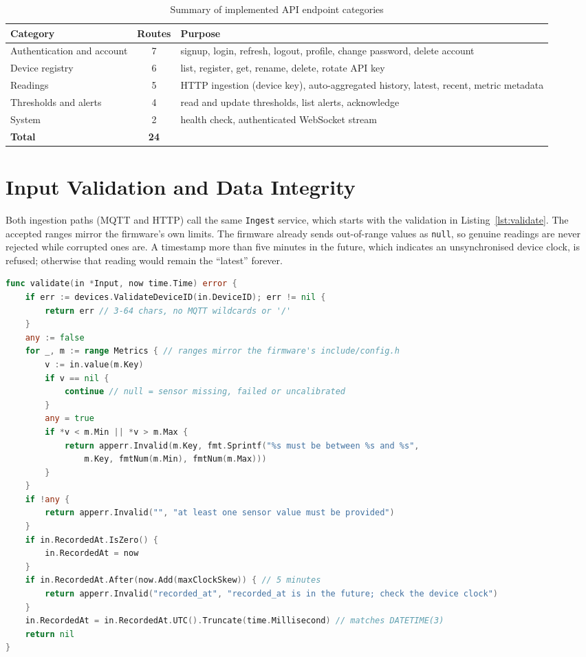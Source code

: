 \documentclass[11pt,a4paper,oneside]{report}
\newcommand{\code}[1]{\texttt{#1}}
\begin{document}
\begin{table}[htbp]
\centering
\caption{Summary of implemented API endpoint categories}
\label{tab:endpoints}
\small
\begin{tabularx}{\linewidth}{@{}l c X@{}}
\toprule
\textbf{Category} & \textbf{Routes} & \textbf{Purpose} \\
\midrule
Authentication and account & 7 & signup, login, refresh, logout, profile, change password, delete account \\
Device registry            & 6 & list, register, get, rename, delete, rotate API key \\
Readings                   & 5 & HTTP ingestion (device key), auto-aggregated history, latest, recent, metric metadata \\
Thresholds and alerts      & 4 & read and update thresholds, list alerts, acknowledge \\
System                     & 2 & health check, authenticated WebSocket stream \\
\midrule
\textbf{Total}             & \textbf{24} & \\
\bottomrule
\end{tabularx}
\end{table}

\section{Input Validation and Data Integrity}
Both ingestion paths (MQTT and HTTP) call the same \code{Ingest} service, which starts
with the validation in Listing~\ref{lst:validate}. The accepted ranges mirror the
firmware's own limits. The firmware already sends out-of-range values as \code{null},
so genuine readings are never rejected while corrupted ones are. A timestamp more than
five minutes in the future, which indicates an unsynchronised device clock, is
refused; otherwise that reading would remain the ``latest'' forever.

\begin{lstlisting}[language=Go, caption={Payload validation against the hardware contract (\code{readings/validate.go})}, label={lst:validate}]
func validate(in *Input, now time.Time) error {
    if err := devices.ValidateDeviceID(in.DeviceID); err != nil {
        return err // 3-64 chars, no MQTT wildcards or '/'
    }
    any := false
    for _, m := range Metrics { // ranges mirror the firmware's include/config.h
        v := in.value(m.Key)
        if v == nil {
            continue // null = sensor missing, failed or uncalibrated
        }
        any = true
        if *v < m.Min || *v > m.Max {
            return apperr.Invalid(m.Key, fmt.Sprintf("%s must be between %s and %s",
                m.Key, fmtNum(m.Min), fmtNum(m.Max)))
        }
    }
    if !any {
        return apperr.Invalid("", "at least one sensor value must be provided")
    }
    if in.RecordedAt.IsZero() {
        in.RecordedAt = now
    }
    if in.RecordedAt.After(now.Add(maxClockSkew)) { // 5 minutes
        return apperr.Invalid("recorded_at", "recorded_at is in the future; check the device clock")
    }
    in.RecordedAt = in.RecordedAt.UTC().Truncate(time.Millisecond) // matches DATETIME(3)
    return nil
}
\end{lstlisting}
\end{document}
